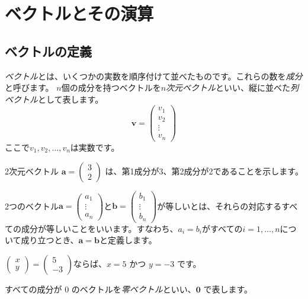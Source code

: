 \section{ベクトルとその演算}
\subsection{ベクトルの定義}

\emph{ベクトル}とは、いくつかの実数を順序付けて並べたものです。これらの数を\emph{成分}と呼びます。
$n$個の成分を持つベクトルを\emph{$n$次元ベクトル}といい、縦に並べた\emph{列ベクトル}として表します。
\[\bm{v} = \begin{pmatrix} v_1 \\ v_2 \\ \vdots \\ v_n \end{pmatrix}\]
ここで$v_1, v_2,\ldots,v_n$は実数です。
\begin{ex}
2次元ベクトル $\bm{a} = \begin{pmatrix} 3 \\ 2 \end{pmatrix}$ は、第1成分が3、第2成分が2であることを示します。
\end{ex}
\begin{dfn}[ベクトルの等しさ]
2つのベクトル$\bm{a}=\begin{pmatrix} a_1 \\ \vdots \\ a_n \end{pmatrix}$と$\bm{b}=\begin{pmatrix} b_1 \\ \vdots \\ b_n \end{pmatrix}$が等しいとは、それらの対応するすべての成分が等しいことをいいます。すなわち、$a_i=b_i$がすべての$i=1,\ldots,n$について成り立つとき、$\bm{a}=\bm{b}$と定義します。
\end{dfn}
\begin{ex}
$\begin{pmatrix} x \\ y \end{pmatrix} = \begin{pmatrix} 5 \\ -3 \end{pmatrix}$ならば、$x=5$ かつ $y=−3$ です。
\end{ex}
\begin{dfn}[零ベクトル]
すべての成分が $0$ のベクトルを\emph{零ベクトル}といい、$\bm{0}$ で表します。
\end{dfn}
